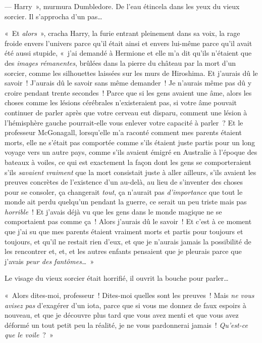 --- Harry~», murmura Dumbledore.
De l'eau étincela dans les yeux du vieux sorcier.
Il s'approcha d'un pas…

«~Et \emph{alors}~», cracha Harry, la furie entrant pleinement dans sa voix, la rage froide envers l'univers parce qu'il était ainsi et envers lui-même parce qu'il avait été aussi stupide, «~j'ai demandé à Hermione et elle m'a dit qu'ils n'étaient que des \emph{images rémanentes}, brûlées dans la pierre du château par la mort d'un sorcier, comme les silhouettes laissées sur les murs de Hiroshima.
Et j'aurais dû le savoir~!
J'aurais dû le savoir sans même demander~!
Je n'aurais même pas dû y croire pendant trente secondes~!
Parce que si les gens avaient une âme, alors les choses comme les lésions cérébrales n'existeraient pas, si votre âme pouvait continuer de parler après que votre cerveau eut disparu, comment une lésion à l'hémisphère gauche pourrait-elle vous enlever votre capacité à parler~?
Et le professeur McGonagall, lorsqu'elle m'a raconté comment mes parents étaient morts, elle ne s'était pas comportée comme s'ils étaient juste partis pour un long voyage vers un autre pays, comme s'ils avaient émigré en Australie à l'époque des bateaux à voiles, ce qui est exactement la façon dont les gens se comporteraient s'ils \emph{savaient vraiment} que la mort consistait juste à aller ailleurs, s'ils avaient les preuves concrètes de l'existence d'un au-delà, au lieu de s'inventer des choses pour se consoler, ça changerait \emph{tout}, ça n'aurait pas \emph{d'importance} que tout le monde ait perdu quelqu'un pendant la guerre, ce serait un peu triste mais pas \emph{horrible}~!
Et j'avais déjà vu que les gens dans le monde magique ne se comportaient pas comme ça~!
Alors j'aurais dû le savoir~!
Et c'est à ce moment que j'ai su que mes parents étaient vraiment morts et partis pour toujours et toujours, et qu'il ne restait rien d'eux, et que je n'aurais jamais la possibilité de les rencontrer et, et, et les autres enfants pensaient que je pleurais parce que j'avais \emph{peur des fantômes…}~»

Le visage du vieux sorcier était horrifié, il ouvrit la bouche pour parler…

«~Alors dites-moi, professeur~!
Dites-moi quelles sont les preuves~!
Mais \emph{ne vous avisez pas} d'exagérer d'un iota, parce que si vous me donnez de faux espoirs à nouveau, et que je découvre plus tard que vous avez menti et que vous avez déformé un tout petit peu la réalité, je ne vous pardonnerai jamais~!
\emph{Qu'est-ce que le voile}~?~»

